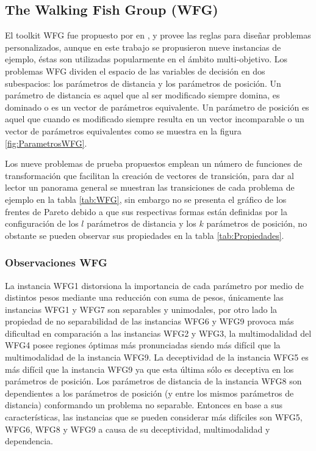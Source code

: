 \subsection{The Walking Fish Group (WFG)}
El toolkit WFG fue propuesto por \citeauthor{Joel:WFG_Main} en \citeyear{Joel:WFG_Main}, y provee las reglas para diseñar problemas personalizados, aunque en este trabajo se propusieron nueve instancias de ejemplo, éstas son utilizadas popularmente en el ámbito multi-objetivo.
%
Los problemas WFG dividen el espacio de las variables de decisión en dos subespacios: los parámetros de distancia y los parámetros de posición.
%
Un parámetro de distancia es aquel que al ser modificado siempre domina, es dominado o es un vector de parámetros equivalente.
%
Un parámetro de posición es aquel que cuando es modificado siempre resulta en un vector incomparable o un vector de parámetros equivalentes como se muestra en la figura \ref{fig:ParametrosWFG}.
%

Los nueve problemas de prueba propuestos emplean un número de funciones de transformación que facilitan la creación de vectores de transición, para dar al lector un panorama general se muestran las transiciones de cada problema de ejemplo en la tabla \ref{tab:WFG}, sin embargo no se presenta el gráfico de los frentes de Pareto debido a que sus respectivas formas están definidas por la configuración de los $l$ parámetros de distancia y los $k$ parámetros de posición, no obstante se pueden observar sus propiedades en la tabla \ref{tab:Propiedades}.
%
\subsubsection*{Observaciones WFG}
La instancia WFG1 distorsiona la importancia de cada parámetro por medio de distintos pesos mediante una reducción con suma de pesos, únicamente las instancias WFG1 y WFG7 son separables y unimodales, por otro lado la propiedad de no separabilidad de las instancias WFG6 y WFG9 provoca más dificultad en comparación a las instancias WFG2 y WFG3, la multimodalidad del WFG4 posee regiones óptimas más pronunciadas siendo más difícil que la multimodalidad de la instancia WFG9.
%
La deceptividad de la instancia WFG5 es más difícil que la instancia WFG9 ya que esta última sólo es deceptiva en los parámetros de posición.
%
Los parámetros de distancia de la instancia WFG8 son dependientes a los parámetros de posición (y entre los mismos parámetros de distancia) conformando un problema no separable.
%
Entonces en base a sus características, las instancias que se pueden considerar más difíciles son WFG5, WFG6, WFG8 y WFG9 a causa de su deceptividad, multimodalidad y dependencia.
%

